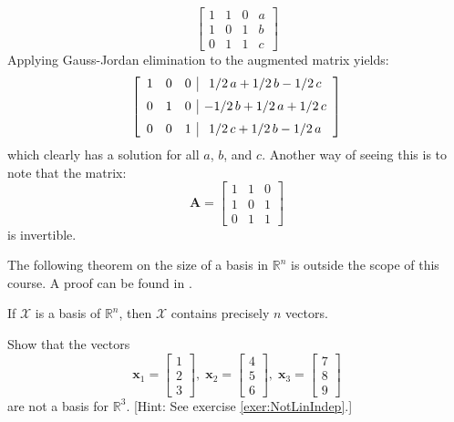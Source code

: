 \begin{example}
\begin{equation} 
\left[\begin{array}{ccc|c}
1 & 1 & 0 & a\\
1 & 0 & 1 & b\\
0 & 1 & 1 & c
\end{array}
\right]
\end{equation}
Applying Gauss-Jordan elimination to the augmented matrix yields:
\begin{equation}
\left[ \begin {array}{ccc|c} 1&0&0&1/2\,a+1/2\,b-1/2\,c
\\ \noalign{\medskip}0&1&0&-1/2\,b+1/2\,a+1/2\,c\\ \noalign{\medskip}0
&0&1&1/2\,c+1/2\,b-1/2\,a\end {array} \right] 
\end{equation}
which clearly has a solution for all $a$, $b$, and $c$. Another way of seeing this is to note that the matrix:
\begin{equation}
\mathbf{A} = \left[\begin{array}{ccc}
1 & 1 & 0\\
1 & 0 & 1\\
0 & 1 & 1
\end{array}
\right]
\end{equation}
is invertible. 
\end{example}

The following theorem on the size of a basis in $\mathbb{R}^n$ is outside the scope of this course. A proof can be found in \cite{Str87}. 
\begin{theorem} If $\mathcal{X}$ is a basis of $\mathbb{R}^n$, then $\mathcal{X}$ contains precisely $n$ vectors.
\label{thm:BasisSize}
\end{theorem}

\begin{exercise}Show that the vectors 
\begin{displaymath}
\mathbf{x}_1 = \begin{bmatrix}
1\\2\\3
\end{bmatrix},\;
\mathbf{x}_2 = \begin{bmatrix}
4\\5\\6
\end{bmatrix},\;
\mathbf{x}_3 = \begin{bmatrix}
7\\8\\9
\end{bmatrix}
\end{displaymath}
are not a basis for $\mathbb{R}^3$. [Hint: See exercise \ref{exer:NotLinIndep}.]
\end{exercise}

